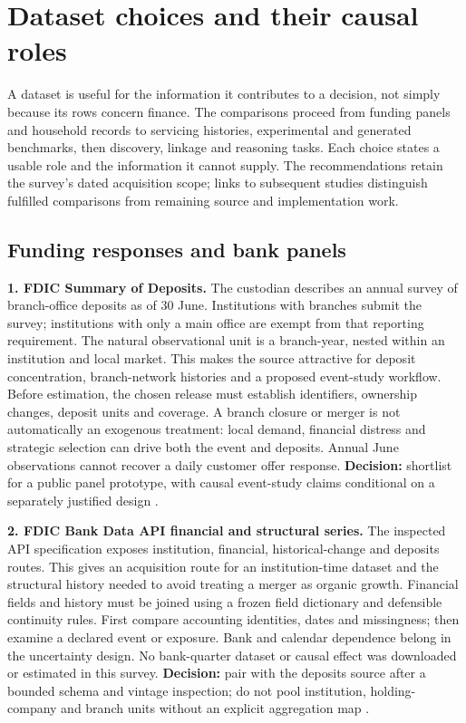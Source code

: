 \hypertarget{pd15:datasets}{%
\chapter{Dataset choices and their causal roles}\label{pd15:datasets}}

A dataset is useful for the information it contributes to a decision, not simply because its rows concern finance. The comparisons proceed from funding panels and household records to servicing histories, experimental and generated benchmarks, then discovery, linkage and reasoning tasks. Each choice states a usable role and the information it cannot supply. The recommendations retain the survey's dated acquisition scope; links to subsequent studies distinguish fulfilled comparisons from remaining source and implementation work.

\hypertarget{funding-responses-and-bank-panels}{%
\section{Funding responses and bank
panels}\label{funding-responses-and-bank-panels}}

\textbf{1. FDIC Summary of Deposits.} The custodian describes an annual
survey of branch-office deposits as of 30 June. Institutions with
branches submit the survey; institutions with only a main office are
exempt from that reporting requirement. The natural observational unit
is a branch-year, nested within an institution and local market. This
makes the source attractive for deposit concentration, branch-network
histories and a proposed event-study workflow. Before estimation, the
chosen release must establish identifiers, ownership changes, deposit
units and coverage. A branch closure or merger is not automatically an
exogenous treatment: local demand, financial distress and strategic
selection can drive both the event and deposits. Annual June
observations cannot recover a daily customer offer response.
\textbf{Decision:} shortlist for a public panel prototype, with causal
event-study claims conditional on a separately justified design
\citep{pd15_fdic_sod}.

\textbf{2. FDIC Bank Data API financial and structural series.} The
inspected API specification exposes institution, financial,
historical-change and deposits routes. This gives an acquisition route
for an institution-time dataset and the structural history needed to
avoid treating a merger as organic growth. Financial fields and history
must be joined using a frozen field dictionary and defensible continuity
rules. First compare accounting identities, dates and missingness; then
examine a declared event or exposure. Bank and calendar dependence
belong in the uncertainty design. No bank-quarter dataset or causal
effect was downloaded or estimated in this survey. \textbf{Decision:}
pair with the deposits source after a bounded schema and vintage
inspection; do not pool institution, holding-company and branch units
without an explicit aggregation map \citep{pd15_fdic_api_spec}.

